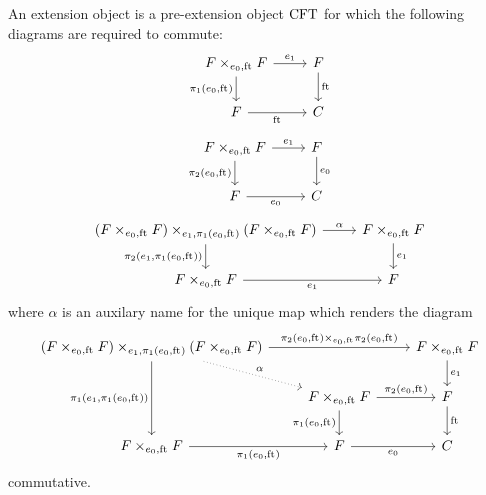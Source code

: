 \begin{defn} An extension object is a pre-extension object $\mathrm{CFT}$ for which 
the following diagrams are required to commute:
\begin{equation*}
\begin{tikzcd}
\stesysff 
  \ar{r}{\efamext} 
  \ar{d}[swap]{\pullbackpr{1}{\ectxext}{\eft}} 
  & 
\stesysf 
  \ar{d}{\eft}
  \\
\stesysf
  \ar{r}[swap]{\eft} 
  & 
\stesysc
\end{tikzcd}
\end{equation*}
\begin{equation*}
\begin{tikzcd}
\stesysff 
  \ar{d}[swap]{\pullbackpr{2}{\ectxext}{\eft}} 
  \ar{r}{\efamext} 
  & 
\stesysf 
  \ar{d}{\ectxext}
  \\
\stesysf 
  \ar{r}[swap]{\ectxext} 
  & 
\stesysc
\end{tikzcd}
\end{equation*}
\begin{equation*}
\begin{tikzcd}
\pullback{\stesysff}{\stesysff}{\efamext}{\pullbackpr{1}{\ectxext}{\eft}} 
  \ar{d}[swap]{\pullbackpr{2}{\efamext}{\pullbackpr{1}{\ectxext}{\eft}}}
  \ar{r}{\alpha}
  & 
\stesysff 
  \ar{d}{\efamext} 
  \\
\stesysff 
  \ar{r}[swap]{\efamext} 
  &
\stesysf
\end{tikzcd}
\end{equation*}
where $\alpha$ is an auxilary name for the unique map which renders the diagram
\begin{equation*}
\begin{tikzcd}
\pullback{\stesysff}{\stesysff}{\efamext}{\pullbackpr{1}{\ectxext}{\eft}}
  \ar[dotted]{dr}{\alpha}
  \ar{rr}{\pullback{\pullbackpr{2}{\ectxext}{\eft}}{\pullbackpr{2}{\ectxext}{\eft}}{\ectxext}{\eft}}
  \ar{dd}[swap]{\pullbackpr{1}{\efamext}{\pullbackpr{1}{\ectxext}{\eft}}}
  & 
  &
\stesysff
  \ar{d}{\efamext}
  \\
  &
\stesysff
  \ar{d}[swap]{\pullbackpr{1}{\ectxext}{\eft}}
  \ar{r}{\pullbackpr{2}{\ectxext}{\eft}}
  &
\stesysf
  \ar{d}{\eft}
  \\
\stesysff
  \ar{r}[swap]{\pullbackpr{1}{\ectxext}{\eft}}
  &
\stesysf
  \ar{r}[swap]{\ectxext}
  &
\stesysc
\end{tikzcd}
\end{equation*}
commutative.
\end{defn}

